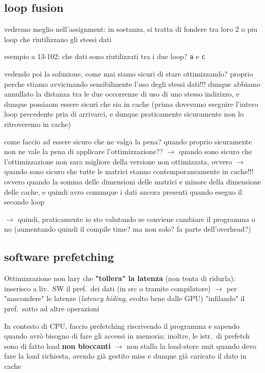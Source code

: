 \subsection{loop fusion}

vedremo meglio nell'assignment: in sostanza, si tratta di fondere tra loro 2 o piu loop che riutilizzano gli stessi dati

esempio a 13-102: che dati sono riutilizzati tra i due loop? \lstinline|a| e \lstinline|c|

vedendo poi la soluzione, come mai siamo sicuri di stare ottimizzando? proprio perche stiamo avvicinando sensibilmente l'uso degli stessi dati!!! dunque abbiamo annullato la distanza tra le due occorrenze di uso di uno stesso indirizzo, e dunque possiaom essere sicuri che sia in cache (prima dovevamo eseguire l'intero loop precedente pria di arrivarci, e dunque praticamente sicuramente non lo ritroveremo in cache)

come faccio ad essere sicuro che ne valga la pena? quando proprio sicuramente non ne vale la pena di applicare l'ottimizzazione?? $\rightarrow$ quando sono sicuro che l'ottimizzazione non sara migliore della versione non ottimizzata, ovvero $\rightarrow$ quando sono sicuro che tutte le matrici stanno contemporaneamente in cache!!! ovvero quando la somma delle dimensioni delle matrici e minore della dimensione delle cache, e quindi avro comunque i dati ancora presenti quando eseguo il secondo loop

$\rightarrow$ quindi, praticamente io sto valutando se conviene cambiare il programma o no (aumentando quindi il compile time? ma non solo? fa parte dell'overhead?)

\subsection{software prefetching}

Ottimizzazione non lazy che \textbf{"tollera" la latenza} (non tenta di ridurla): inserisco a liv.~SW il pref.~dei dati (in src o tramite compilatore) $\rightarrow$ per "nascondere" le latenze (\textit{latency hiding}, svolto bene dalle GPU) "infilando" il pref.~sotto ad altre operazioni

In contesto di CPU, faccio prefetching riscrivendo il programma e sapendo quando avr\`o bisogno di fare gli accessi in memoria; inoltre, le istr.~di prefetch sono di fatto load \textbf{non bloccanti} $\rightarrow$ non stalla la load-store unit quando devo fare la load richiesta, avendo gi\`a gestito miss e dunque gi\`a caricato il dato in cache

